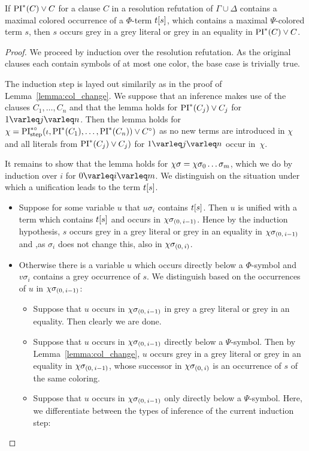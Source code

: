 \documentclass[,%
	draft=false,%
	numbers=noendperiod
	12pt,
	a4paper,
	oneside,%
	openany,
]{memoir}
\newcommand{\inv}{\ensuremath{\chi}}
\begin{document}
\begin{lemma}
	If $\operatorname{PI}^*(C) \lor C$ for a clause $C$ in a resolution refutation of $\Gamma \cup \Delta$ contains a maximal colored occurrence of a $\Phi$-term $t[s]$, which contains a maximal $\Psi$-colored term $s$, then $s$ occurs grey in a grey literal or grey in an equality in $\operatorname{PI}^*(C) \lor C$.
\end{lemma}
\begin{proof}
	We proceed by induction over the resolution refutation.
	As the original clauses each contain symbols of at most one color, the base case is trivially true.

	The induction step is layed out similarily as in the proof of Lemma~\ref{lemma:col_change}. 
	We suppose that an inference makes use of the clauses $C_1, \dots, C_n$ and that the lemma holds for $\operatorname{PI}^*(C_j) \lor C_j$ for $1\varleq j \varleq n$. 
	Then the lemma holds for $\inv = \PIstepstarnosigma(\inference, \PI^*(C_1), \dots, \PI^*(C_n)) \lor C\nosigma)$ as no new terms are introduced in $\inv$ and all literals from $\operatorname{PI}^*(C_j) \lor C_j)$ for $1\varleq j \varleq n$ occur in~$\inv$.

	It remains to show that the lemma holds for $\inv\sigma = \inv \sigma_0 \quantifierdots \sigma_m$, which we do by induction over $i$ for $0 \varleq i \varleq m$.
	We distinguish on the situation under which a unification leads to the term $t[s]$.

	\begin{itemize}
		\item 
			Suppose for some variable $u$ that $u\sigma_i$ contains $t[s]$. 
			Then $u$ is unified with a term which contains $t[s]$ and occurs in $\inv\sigmazmi$.
			Hence by the induction hypothesis, $s$ occurs grey in a grey literal or grey in an equality in $\inv\sigmazmi$ and ,as $\sigma_i$ does not change this, also in $\inv\sigmazi$.

		\item 
			Otherwise there is a variable $u$ which occurs directly below a $\Phi$-symbol and $v\sigma_i$ contains a grey occurrence of $s$.
			We distinguish based on the occurrences of $u$ in $\inv\sigmazmi$:

			\begin{itemize}
				\item Suppose that $u$ occurs in $\inv\sigmazmi$ in grey a grey literal or grey in an equality. Then clearly we are done.
				\item Suppose that $u$ occurs in $\inv\sigmazmi$ directly below a $\Psi$-symbol.
					Then by Lemma~\ref{lemma:col_change}, $u$ occurs grey in a grey literal or grey in an equality in $\inv\sigmazmi$, whose successor in $\inv\sigmazi$ is an occurrence of $s$ of the same coloring.
				\item Suppose that $u$ occurs in $\inv\sigmazmi$ only directly below a $\Psi$-symbol.
					Here, we differentiate between the types of inference of the current induction step:


\end{itemize}
\end{itemize}
\end{proof}
\end{document}
